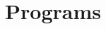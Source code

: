 

\newcommand{\wfexfile}{\texttt{ci\-clo\-pro\-pa\-no\_\-pbe\-63\-11.wfx}}
\newcommand{\progusg}[2]{\phantom{asd}\\\texttt{\phantom{MMM}\$#1 ciclopropano\_pbe6311.wfx #2}\\\phantom{asfd}\\}

\chapter{Programs}

